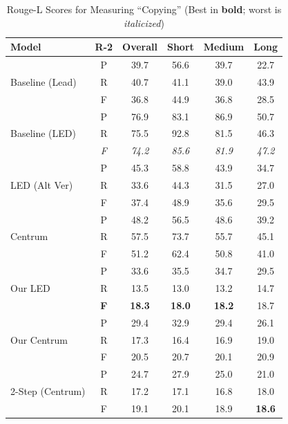 \documentclass[12pt, twocolumn]{article}
\numberwithin{equation}{section}
\begin{document}
\begin{table}
    \centering
    \footnotesize
    \begin{tabular}{|p{1.5cm}|c|c|c|c|c|}
    \hline
        Model & R-2 & Overall & Short & Medium & Long \\ \hline
        \multirow{3}{1.5cm}{Baseline (Lead)} 
	& P & 39.7 & 56.6 & 39.7 & 22.7 \\ \cline{2-6}
        & R & 40.7 & 41.1 & 39.0 & 43.9 \\ \cline{2-6}
        & F & 36.8 & 44.9 & 36.8 & 28.5 \\ \hline
        \multirow{3}{1.5cm}{Baseline (LED)} 
	& P & 76.9 & 83.1 & 86.9 & 50.7 \\ \cline{2-6}
        & R & 75.5 & 92.8 & 81.5 & 46.3 \\ \cline{2-6}
        & \textit{F} & \textit{74.2} & \textit{85.6} & \textit{81.9} & \textit{47.2} \\ \hline
        \multirow{3}{1.5cm}{LED (Alt Ver)} 
	& P & 45.3 & 58.8 & 43.9 & 34.7 \\ \cline{2-6}
        & R & 33.6 & 44.3 & 31.5 & 27.0 \\ \cline{2-6}
        & F & 37.4 & 48.9 & 35.6 & 29.5 \\ \hline
        \multirow{3}{1.5cm}{Centrum} 
	& P & 48.2 & 56.5 & 48.6 & 39.2 \\ \cline{2-6}
        & R & 57.5 & 73.7 & 55.7 & 45.1 \\ \cline{2-6}
        & F & 51.2 & 62.4 & 50.8 & 41.0 \\ \hline
        \multirow{3}{1.5cm}{Our LED} 
	& P & 33.6 & 35.5 & 34.7 & 29.5 \\ \cline{2-6}
        & R & 13.5 & 13.0 & 13.2 & 14.7 \\ \cline{2-6}
        & \textbf{F} & \textbf{18.3} & \textbf{18.0} & \textbf{18.2} & 18.7 \\ \hline
        \multirow{3}{1.5cm}{Our Centrum} 
	& P & 29.4 & 32.9 & 29.4 & 26.1 \\ \cline{2-6}
        & R & 17.3 & 16.4 & 16.9 & 19.0 \\ \cline{2-6}
        & F & 20.5 & 20.7 & 20.1 & 20.9 \\ \hline
        \multirow{3}{1.5cm}{2-Step (Centrum)} 
	& P & 24.7 & 27.9 & 25.0 & 21.0 \\ \cline{2-6}
        & R & 17.2 & 17.1 & 16.8 & 18.0 \\ \cline{2-6}
        & F & 19.1 & 20.1 & 18.9 & \textbf{18.6} \\ \hline
    \end{tabular}
    \caption{Rouge-L Scores for Measuring ``Copying'' (Best in \textbf{bold}; worst is \textit{italicized})}
    \label{tab:rouge-l-copy}
\end{table}
\end{document}
